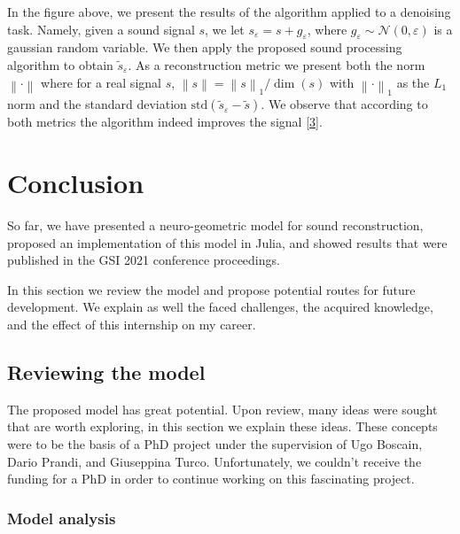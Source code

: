 \documentclass[american,]{article}
\theoremstyle{definition}
\theoremstyle{definition}
\theoremstyle{definition}
\theoremstyle{remark}
\begin{document}
In the figure above, we present the results of the algorithm applied to a denoising task.
Namely, given a sound signal \(s\), we let \(s_\varepsilon= s + g_\varepsilon\),
where \(g_\varepsilon\sim \mathcal N(0,\varepsilon)\) is a gaussian random variable.
We then apply the proposed sound processing algorithm to obtain \(\tilde s_\varepsilon\).
As a reconstruction metric we present both the norm \(\left\lVert\cdot\right\rVert\)
where for a real signal \(s\), \(\left\lVert s\right\rVert = \left\lVert s\right\rVert_1/\dim(s)\)
with \(\left\lVert\cdot\right\rVert_1\) as the \(L_1\) norm
and the standard deviation \(\mathrm{std}(\tilde s_\varepsilon -\tilde s)\).
We observe that according to both metrics the algorithm indeed improves the signal {[}\protect\hyperlink{ref-asswad2021}{3}{]}.

\pagebreak

\hypertarget{conclusion}{%
\section{Conclusion}\label{conclusion}}

So far, we have presented a neuro-geometric model for sound reconstruction,
proposed an implementation of this model in Julia,
and showed results that were published in the GSI 2021 conference proceedings.

In this section we review the model and propose potential
routes for future development.
We explain as well the faced challenges, the acquired knowledge,
and the effect of this internship on my career.

\hypertarget{reviewing-the-model}{%
\subsection{Reviewing the model}\label{reviewing-the-model}}

The proposed model has great potential.
Upon review, many ideas were sought that are worth exploring,
in this section we explain these ideas.
These concepts were to be the basis of a PhD project
under the supervision of Ugo Boscain, Dario Prandi, and Giuseppina Turco.
Unfortunately, we couldn't receive the funding for a PhD
in order to continue working on this fascinating project.

\hypertarget{model-analysis}{%
\subsubsection{Model analysis}\label{model-analysis}}
\end{document}
